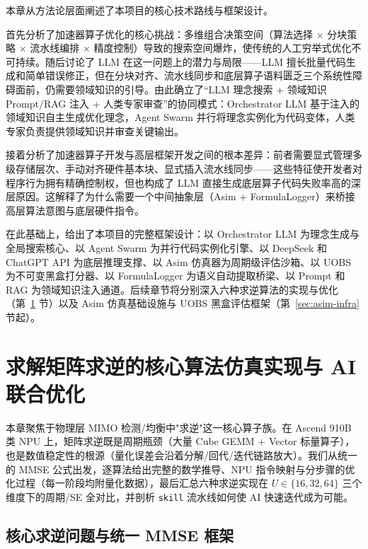 \documentclass{CjC}
\begin{document}
    本章从方法论层面阐述了本项目的核心技术路线与框架设计。

    首先分析了加速器算子优化的核心挑战：多维组合决策空间（算法选择 $\times$
    分块策略 $\times$ 流水线编排 $\times$
    精度控制）导致的搜索空间爆炸，使传统的人工穷举式优化不可持续。随后讨论了 LLM
    在这一问题上的潜力与局限——LLM
    擅长批量代码生成和简单错误修正，但在分块对齐、流水线同步和底层算子语料匮乏三个系统性障碍面前，仍需要领域知识的引导。由此确立了“LLM
    理念搜索 + 领域知识 Prompt/RAG 注入 + 人类专家审查”的协同模式：Orchestrator
    LLM 基于注入的领域知识自主生成优化理念，Agent Swarm
    并行将理念实例化为代码变体，人类专家负责提供领域知识并审查关键输出。

    接着分析了加速器算子开发与高层框架开发之间的根本差异：前者需要显式管理多级存储层次、手动对齐硬件基本块、显式插入流水线同步——这些特征使开发者对程序行为拥有精确控制权，但也构成了
    LLM 直接生成底层算子代码失败率高的深层原因。这解释了为什么需要一个中间抽象层（Asim
    + FormulaLogger）来桥接高层算法意图与底层硬件指令。

    在此基础上，给出了本项目的完整框架设计：以 Orchestrator LLM
    为理念生成与全局搜索核心、以 Agent Swarm 为并行代码实例化引擎、以 DeepSeek
    和 ChatGPT API 为底层推理支撑、以 Asim 仿真器为周期级评估沙箱、以 UOBS
    为不可变黑盒打分器、以 FormulaLogger 为语义自动提取桥梁、以 Prompt 和 RAG
    为领域知识注入通道。后续章节将分别深入六种求逆算法的实现与优化（第~\ref{sec:algorithms}
    节）以及 Asim 仿真基础设施与 UOBS 黑盒评估框架（第~\ref{sec:asim-infra}
    节起）。

    \section{求解矩阵求逆的核心算法仿真实现与 AI 联合优化}
    \label{sec:algorithms}

    本章聚焦于物理层 MIMO 检测/均衡中"求逆"这一核心算子族。在 Ascend 910B 类 NPU
    上，矩阵求逆既是周期瓶颈（大量 Cube GEMM + Vector
    标量算子），也是数值稳定性的根源（量化误差会沿着分解/回代/迭代链路放大）。我们从统一的
    MMSE 公式出发，逐算法给出完整的数学推导、NPU
    指令映射与分步骤的优化过程（每一阶段均附量化数据），最后汇总六种求逆实现在
    $U\in\{16,32,64\}$ 三个维度下的周期/SE 全对比，并剖析 \texttt{skill} 流水线如何使
    AI 快速迭代成为可能。

    \subsection{核心求逆问题与统一 MMSE 框架}
    \label{sec:mmse-unified}
\end{document}

